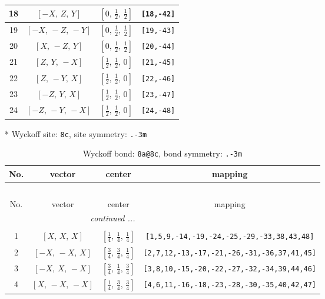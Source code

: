 \documentclass[fleqn,8pt]{jsarticle}
\begin{document}
\begin{longtable}{cccc}
18 & $\left[ - X,\, Z,\, Y \right]$ & $\left[ 0,\, \frac{1}{2},\, \frac{1}{2} \right]$ & {\tt [18,-42]} \\ \hline
19 & $\left[ - X,\, - Z,\, - Y \right]$ & $\left[ 0,\, \frac{1}{2},\, \frac{1}{2} \right]$ & {\tt [19,-43]} \\ \hline
20 & $\left[ X,\, - Z,\, Y \right]$ & $\left[ 0,\, \frac{1}{2},\, \frac{1}{2} \right]$ & {\tt [20,-44]} \\ \hline
21 & $\left[ Z,\, Y,\, - X \right]$ & $\left[ \frac{1}{2},\, \frac{1}{2},\, 0 \right]$ & {\tt [21,-45]} \\ \hline
22 & $\left[ Z,\, - Y,\, X \right]$ & $\left[ \frac{1}{2},\, \frac{1}{2},\, 0 \right]$ & {\tt [22,-46]} \\ \hline
23 & $\left[ - Z,\, Y,\, X \right]$ & $\left[ \frac{1}{2},\, \frac{1}{2},\, 0 \right]$ & {\tt [23,-47]} \\ \hline
24 & $\left[ - Z,\, - Y,\, - X \right]$ & $\left[ \frac{1}{2},\, \frac{1}{2},\, 0 \right]$ & {\tt [24,-48]} \\
\end{longtable}
* Wyckoff site: {\tt 8c}, site symmetry: {\tt .-3m}
\renewcommand{\arraystretch}{1.2}
\begin{longtable}{cccc}
\caption{Wyckoff bond: {\tt 8a@8c}, bond symmetry: {\tt .-3m}}
 \\
 \hline \hline
No. & vector & center & mapping \\ \hline \endfirsthead

\multicolumn{3}{l}{\tablename\ \thetable{}} \\
 \hline \hline
No. & vector & center & mapping \\ \hline \endhead

 \hline \hline
\multicolumn{3}{r}{\footnotesize\it continued ...} \\ \endfoot

 \hline \hline
\multicolumn{3}{r}{} \\ \endlastfoot

1 & $\left[ X,\, X,\, X \right]$ & $\left[ \frac{1}{4},\, \frac{1}{4},\, \frac{1}{4} \right]$ & {\tt [1,5,9,-14,-19,-24,-25,-29,-33,38,43,48]} \\ \hline
2 & $\left[ - X,\, - X,\, X \right]$ & $\left[ \frac{3}{4},\, \frac{3}{4},\, \frac{1}{4} \right]$ & {\tt [2,7,12,-13,-17,-21,-26,-31,-36,37,41,45]} \\ \hline
3 & $\left[ - X,\, X,\, - X \right]$ & $\left[ \frac{3}{4},\, \frac{1}{4},\, \frac{3}{4} \right]$ & {\tt [3,8,10,-15,-20,-22,-27,-32,-34,39,44,46]} \\ \hline
4 & $\left[ X,\, - X,\, - X \right]$ & $\left[ \frac{1}{4},\, \frac{3}{4},\, \frac{3}{4} \right]$ & {\tt [4,6,11,-16,-18,-23,-28,-30,-35,40,42,47]} \\
\end{longtable}
\end{document}

